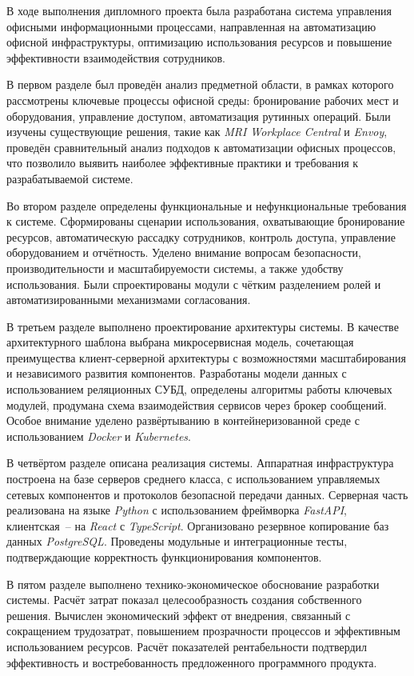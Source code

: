 
В ходе выполнения дипломного проекта была разработана система управления офисными информационными процессами, направленная на автоматизацию офисной инфраструктуры, оптимизацию использования ресурсов и повышение эффективности взаимодействия сотрудников.

В первом разделе был проведён анализ предметной области, в рамках которого рассмотрены ключевые процессы офисной среды: бронирование рабочих мест и оборудования, управление доступом, автоматизация рутинных операций. Были изучены существующие решения, такие как \textit{MRI Workplace Central} и \textit{Envoy}, проведён сравнительный анализ подходов к автоматизации офисных процессов, что позволило выявить наиболее эффективные практики и требования к разрабатываемой системе.

Во втором разделе определены функциональные и нефункциональные требования к системе. Сформированы сценарии использования, охватывающие бронирование ресурсов, автоматическую рассадку сотрудников, контроль доступа, управление оборудованием и отчётность. Уделено внимание вопросам безопасности, производительности и масштабируемости системы, а также удобству использования. Были спроектированы модули с чётким разделением ролей и автоматизированными механизмами согласования.

В третьем разделе выполнено проектирование архитектуры системы. В качестве архитектурного шаблона выбрана микросервисная модель, сочетающая преимущества клиент-серверной архитектуры с возможностями масштабирования и независимого развития компонентов. Разработаны модели данных с использованием реляционных СУБД, определены алгоритмы работы ключевых модулей, продумана схема взаимодействия сервисов через брокер сообщений. Особое внимание уделено развёртыванию в контейнеризованной среде с использованием \textit{Docker} и \textit{Kubernetes}.

В четвёртом разделе описана реализация системы. Аппаратная инфраструктура построена на базе серверов среднего класса, с использованием управляемых сетевых компонентов и протоколов безопасной передачи данных. Серверная часть реализована на языке \textit{Python} с использованием фреймворка \textit{FastAPI}, клиентская~-- на \textit{React} с \textit{TypeScript}. Организовано резервное копирование баз данных \textit{PostgreSQL}. Проведены модульные и интеграционные тесты, подтверждающие корректность функционирования компонентов.

В пятом разделе выполнено технико-экономическое обоснование разработки системы. Расчёт затрат показал целесообразность создания собственного решения. Вычислен экономический эффект от внедрения, связанный с сокращением трудозатрат, повышением прозрачности процессов и эффективным использованием ресурсов. Расчёт показателей рентабельности подтвердил эффективность и востребованность предложенного программного продукта.

